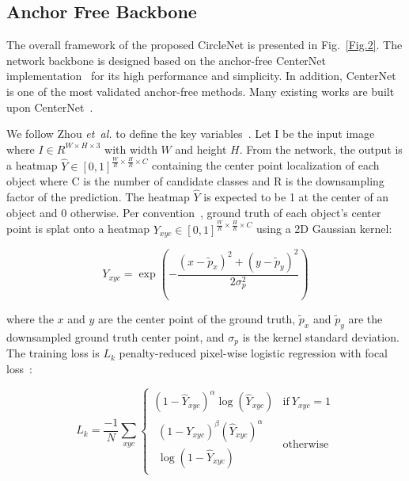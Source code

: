 \documentclass[journal]{IEEEtran}
\newcommand{\Fig}{Fig.}
\begin{document}
\subsection{Anchor Free Backbone}
The overall framework of the proposed CircleNet is presented in \Fig ~\ref{Fig.2}. The network backbone is designed based on the anchor-free CenterNet implementation~\cite{zhou2019objects} for its high performance and simplicity. In addition, CenterNet is one of the most validated anchor-free methods. Many existing works are built upon CenterNet~\cite{peng2020deep, zhou2020tracking, li2020rtm3d}.

We follow Zhou \textit{et~al.} to define the key variables~\cite{zhou2019objects}. Let I be the input image where  $I \in R^{W \times H \times 3}$ with width $W$ and height $H$. From the network, the output is a heatmap $\hat Y \in [0,1]^{\frac{W}{R} \times \frac{H}{R} \times C}$ containing the center point localization of each object where C is the number of candidate classes and R is the downsampling factor of the prediction. The heatmap $\hat Y$ is expected to be 1 at the center of an object and 0 otherwise. Per convention~\cite{law2018cornernet, zhou2019objects}, ground truth of each object's center point is splat onto a heatmap $Y_{xyc} \in [0,1]^{\frac{W}{R} \times \frac{H}{R} \times C}$ using a 2D Gaussian kernel:

\begin{equation}
{Y_{xyc} = \exp\left(-\frac{(x-\tilde p_x)^2+(y-\tilde p_y)^2}{2\sigma_p^2}\right)}
\end{equation} 

where the $x$ and $y$ are the center point of the ground truth, $\tilde p_x$ and $\tilde p_y$ are the downsampled ground truth center point, and $\sigma_p$ is the kernel standard deviation. The training loss is $L_{k}$ penalty-reduced pixel-wise logistic regression with focal loss~\cite{lin2017focal}:

\begin{equation}
    L_k = \frac{-1}{N} \sum_{xyc}
    \begin{cases}
        (1 - \hat{Y}_{xyc})^{\alpha} 
        \log(\hat{Y}_{xyc}) & \!\text{if}\ Y_{xyc}=1\\
        \begin{array}{c}
        (1-Y_{xyc})^{\beta} 
        (\hat{Y}_{xyc})^{\alpha}\\
        \log(1-\hat{Y}_{xyc})
        \end{array}
        & \!\text{otherwise}
    \end{cases}
\end{equation}
\end{document}
